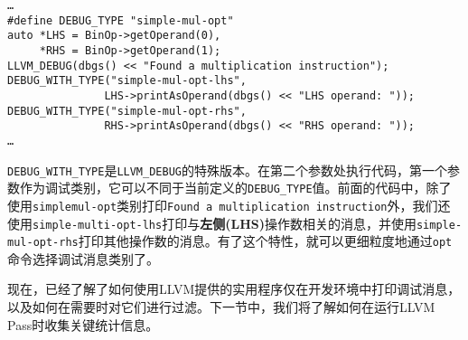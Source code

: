 \begin{lstlisting}[style=styleCXX]
…
#define DEBUG_TYPE "simple-mul-opt"
auto *LHS = BinOp->getOperand(0),
     *RHS = BinOp->getOperand(1);
LLVM_DEBUG(dbgs() << "Found a multiplication instruction");
DEBUG_WITH_TYPE("simple-mul-opt-lhs",
               LHS->printAsOperand(dbgs() << "LHS operand: "));
DEBUG_WITH_TYPE("simple-mul-opt-rhs",
               RHS->printAsOperand(dbgs() << "RHS operand: "));
…
\end{lstlisting}

\texttt{DEBUG\_WITH\_TYPE}是\texttt{LLVM\_DEBUG}的特殊版本。在第二个参数处执行代码，第一个参数作为调试类别，它可以不同于当前定义的\texttt{DEBUG\_TYPE}值。前面的代码中，除了使用\texttt{simplemul-opt}类别打印\texttt{Found a multiplication instruction}外，我们还使用\texttt{simple-multi-opt-lhs}打印与\textbf{左侧(LHS)}操作数相关的消息，并使用\texttt{simple-mul-opt-rhs}打印其他操作数的消息。有了这个特性，就可以更细粒度地通过\texttt{opt}命令选择调试消息类别了。

现在，已经了解了如何使用LLVM提供的实用程序仅在开发环境中打印调试消息，以及如何在需要时对它们进行过滤。下一节中，我们将了解如何在运行LLVM Pass时收集关键统计信息。









